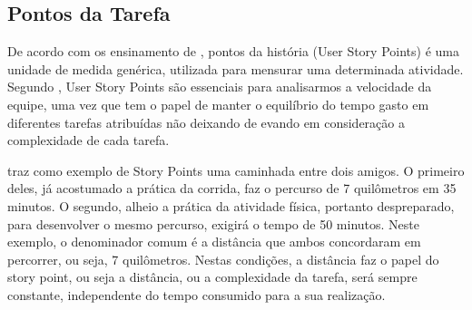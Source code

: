\subsection{Pontos da Tarefa}
De acordo com os ensinamento de \citeauthor{scrumorgstorypoints}, pontos da história (User Story Points) é uma unidade de medida genérica, utilizada para mensurar uma determinada atividade. Segundo \citeauthor{scrumorgstorypoints}, User Story Points são essenciais para analisarmos a velocidade da equipe, uma vez que tem o papel de manter o equilíbrio do tempo gasto em diferentes tarefas atribuídas não deixando de evando em consideração a complexidade de cada tarefa.\par
\citeauthor{storypointsculturaagilexemplo} traz como exemplo de Story Points uma caminhada entre dois amigos. O primeiro deles, já acostumado a prática da corrida, faz o percurso de 7 quilômetros em 35 minutos. O segundo, alheio a prática da atividade física, portanto despreparado, para desenvolver o mesmo percurso, exigirá o tempo de 50 minutos. Neste exemplo, o denominador comum é a distância que ambos concordaram em percorrer, ou seja, 7 quilômetros. Nestas condições, a distância faz o papel do story point, ou seja a distância, ou a complexidade da tarefa, será sempre constante, independente do tempo consumido para a sua realização.